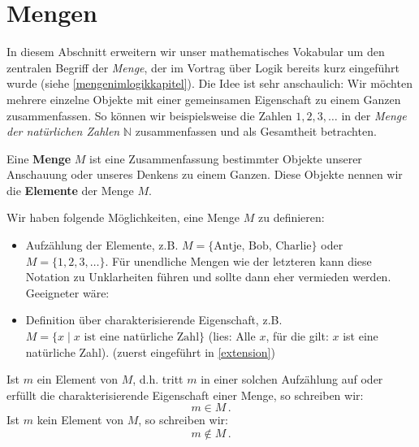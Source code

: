 %                                                                 
%
%
%

\section{Mengen}
In diesem Abschnitt erweitern wir unser mathematisches Vokabular um den zentralen Begriff der \textit{Menge}, der im Vortrag über Logik bereits kurz eingeführt wurde (siehe \cref{mengenimlogikkapitel}). Die Idee ist sehr anschaulich: Wir möchten mehrere einzelne Objekte mit einer gemeinsamen Eigenschaft zu einem Ganzen zusammenfassen. So können wir beispielsweise die Zahlen $1,2,3,\dots$ in der \textit{Menge der natürlichen Zahlen} $\mathbb{N}$ zusammenfassen und als Gesamtheit betrachten.


\begin{de}
Eine \textbf{Menge} $M$ ist eine Zusammenfassung bestimmter Objekte unserer Anschauung oder unseres Denkens zu einem Ganzen. Diese Objekte nennen wir die \textbf{Elemente} der Menge $M$. 
\end{de}

\begin{notion}
Wir haben folgende Möglichkeiten, eine Menge $M$ zu definieren: 
	\begin{itemize}
	\item Aufzählung der Elemente, z.B. $M = \{ \text{Antje, Bob, Charlie} \}$ oder $M = \{1, 2, 3, \ldots \}$. Für unendliche Mengen wie der letzteren kann diese Notation zu Unklarheiten führen und sollte dann eher vermieden werden. Geeigneter wäre:
	\item Definition über charakterisierende Eigenschaft, z.B. $M = \{ x \mid  x\text{ ist eine natürliche Zahl}\}$ (lies: Alle $x$, für die gilt: $x$ ist eine natürliche Zahl). (zuerst eingeführt in \cref{extension})
	\end{itemize}

Ist $m$ ein Element von $M$, d.h. tritt $m$ in einer solchen Aufzählung auf oder erfüllt die charakterisierende Eigenschaft einer Menge, so schreiben wir:
	\[m \in M \,.\]
Ist $m$ kein Element von $M$, so schreiben wir:
	\[m \notin M \,.\]
\end{notion}

